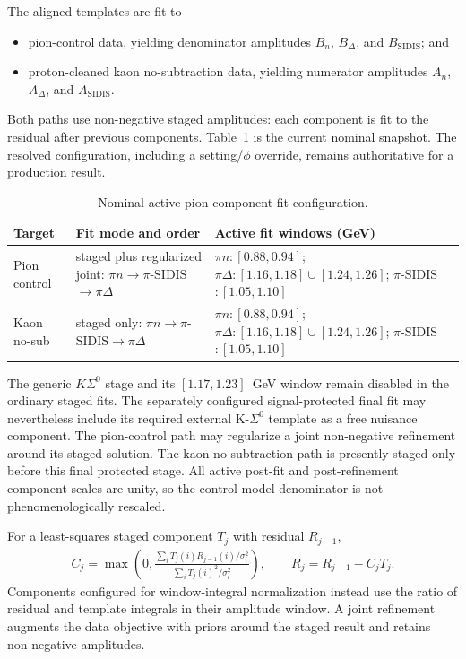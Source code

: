 \documentclass[11pt]{article}
\begin{document}
The aligned templates are fit to
\begin{itemize}[leftmargin=2em]
  \item pion-control data, yielding denominator amplitudes
        $B_n$, $B_\Delta$, and $B_{\mathrm{SIDIS}}$; and
  \item proton-cleaned kaon no-subtraction data, yielding numerator amplitudes
        $A_n$, $A_\Delta$, and $A_{\mathrm{SIDIS}}$.
\end{itemize}

Both paths use non-negative staged amplitudes: each component is fit to the
residual after previous components.  Table~\ref{tab:pion-config} is the
current nominal snapshot.  The resolved configuration, including a
setting/$\phi$ override, remains authoritative for a production result.

\begin{table}[htbp]
  \centering
  \caption{Nominal active pion-component fit configuration.}
  \label{tab:pion-config}
  \begin{tabular}{@{}p{}p{}p{}@{}}
    \toprule
    Target & Fit mode and order & Active fit windows (GeV) \\
    \midrule
    Pion control &
      staged plus regularized joint: $\pi n\to\pi$-SIDIS$\to\pi\Delta$ &
      $\pi n:[0.88,0.94]$; $\pi\Delta:[1.16,1.18]\cup[1.24,1.26]$;
      $\pi$-SIDIS$:[1.05,1.10]$ \\
    Kaon no-sub &
      staged only: $\pi n\to\pi$-SIDIS$\to\pi\Delta$ &
      $\pi n:[0.88,0.94]$; $\pi\Delta:[1.16,1.18]\cup[1.24,1.26]$;
      $\pi$-SIDIS$:[1.05,1.10]$ \\
    \bottomrule
  \end{tabular}
\end{table}

The generic $K\Sigma^0$ stage and its $[1.17,1.23]$~GeV window remain disabled
in the ordinary staged fits.  The separately configured signal-protected final
fit may nevertheless include its required external K-$\Sigma^0$ template as a
free nuisance component.  The pion-control path may regularize a joint
non-negative refinement around its staged solution.  The kaon no-subtraction
path is presently staged-only before this final protected stage.  All active
post-fit and post-refinement component scales are unity, so the control-model
denominator is not phenomenologically rescaled.

For a least-squares staged component $T_j$ with residual $R_{j-1}$,
\begin{align}
  C_j=\max\left(0,
    \frac{\sum_iT_j(i)R_{j-1}(i)/\sigma_i^2}
         {\sum_iT_j(i)^2/\sigma_i^2}\right),
  \qquad R_j=R_{j-1}-C_jT_j.
\end{align}
Components configured for window-integral normalization instead use the ratio
of residual and template integrals in their amplitude window.  A joint
refinement augments the data objective with priors around the staged result
and retains non-negative amplitudes.
\end{document}
